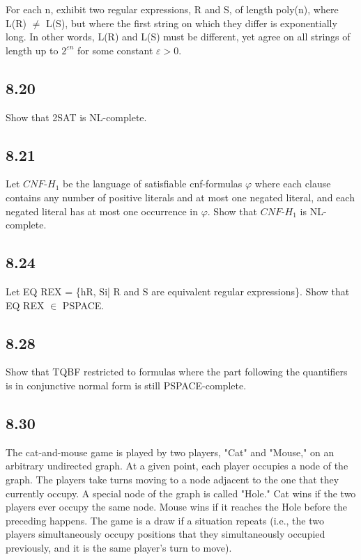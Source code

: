For each n, exhibit two regular expressions, R and S, of length poly(n), where L(R) $\neq$ L(S), but where the first string on which they differ is exponentially long. In other words, L(R) and L(S) must be different, yet agree on all strings of length up to $2^{\varepsilon n}$ for some constant $\varepsilon > 0$.


\subsection*{8.20}

Show that 2SAT is NL-complete.


\subsection*{8.21}

Let $CNF\text{-}H_1$ be the language of satisfiable cnf-formulas $\varphi$ where each clause contains any number of positive literals and at most one negated literal, and each negated literal has at most one occurrence in $\varphi$. Show that $CNF\text{-}H_1$ is NL-complete.


\subsection*{8.24}

Let EQ REX = \{hR, Si| R and S are equivalent regular expressions\}. Show that EQ REX $\in$ PSPACE.


\subsection*{8.28}

Show that TQBF restricted to formulas where the part following the quantifiers is in conjunctive normal form is still PSPACE-complete.


\subsection*{8.30}

The cat-and-mouse game is played by two players, "Cat" and "Mouse," on an arbitrary undirected graph. At a given point, each player occupies a node of the graph. The players take turns moving to a node adjacent to the one that they currently occupy. A special node of the graph is called "Hole." Cat wins if the two players ever occupy the same node. Mouse wins if it reaches the Hole before the preceding happens. The game is a draw if a situation repeats (i.e., the two players simultaneously occupy positions that they simultaneously occupied previously, and it is the same player's turn to move).

